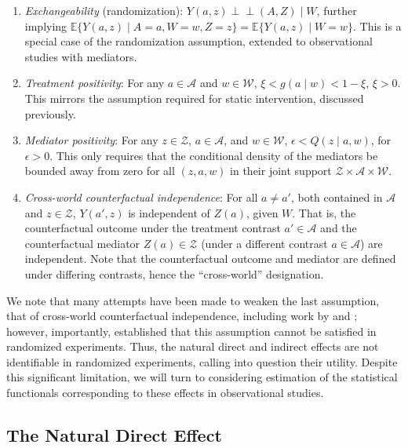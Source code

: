 \documentclass[12pt, krantz2,]{krantz}
\providecommand{\tightlist}{%
  \setlength{\itemsep}{0pt}\setlength{\parskip}{0pt}}
\theoremstyle{definition}
\theoremstyle{definition}
\theoremstyle{definition}
\newcommand{\E}{\mathbb{E}}
\newcommand{\1}{\mathbbm{1}}
\newcommand{\indep}{\mbox{$\perp\!\!\!\perp$}}
\begin{document}
\begin{enumerate}
\def\labelenumi{\arabic{enumi}.}
\tightlist
\item
  \emph{Exchangeability} (randomization): \(Y(a, z) \indep (A, Z) \mid W\), further
  implying \(\E\{Y(a, z) \mid A=a, W=w, Z=z\} = \E\{Y(a, z) \mid W=w\}\). This
  is a special case of the randomization assumption, extended to observational
  studies with mediators.
\item
  \emph{Treatment positivity}: For any \(a \in \mathcal{A}\) and \(w \in \mathcal{W}\), \(\xi < g(a \mid w) < 1 - \xi\), \(\xi > 0\). This mirrors the
  assumption required for static intervention, discussed previously.
\item
  \emph{Mediator positivity}: For any \(z \in \mathcal{Z}\), \(a \in \mathcal{A}\), and
  \(w \in \mathcal{W}\), \(\epsilon < Q(z \mid a, w)\), for \(\epsilon > 0\). This
  only requires that the conditional density of the mediators be bounded away
  from zero for all \((z, a, w)\) in their joint support \(\mathcal{Z} \times \mathcal{A} \times \mathcal{W}\).
\item
  \emph{Cross-world counterfactual independence}: For all \(a \neq a'\), both
  contained in \(\mathcal{A}\) and \(z \in \mathcal{Z}\), \(Y(a', z)\) is independent
  of \(Z(a)\), given \(W\). That is, the counterfactual outcome under the treatment
  contrast \(a' \in \mathcal{A}\) and the counterfactual mediator \(Z(a) \in \mathcal{Z}\) (under a different contrast \(a \in \mathcal{A}\)) are
  independent. Note that the counterfactual outcome and mediator are defined
  under differing contrasts, hence the ``cross-world'' designation.
\end{enumerate}

We note that many attempts have been made to weaken the last assumption, that of
cross-world counterfactual independence, including work by
\citet{petersen2006estimation} and \citet{imai2010identification}; however, importantly,
\citet{robins2010alternative} established that this assumption cannot be satisfied in
randomized experiments. Thus, the natural direct and indirect effects are not
identifiable in randomized experiments, calling into question their utility.
Despite this significant limitation, we will turn to considering estimation of
the statistical functionals corresponding to these effects in observational
studies.

\hypertarget{the-natural-direct-effect}{%
\subsection{The Natural Direct Effect}\label{the-natural-direct-effect}}
\end{document}
